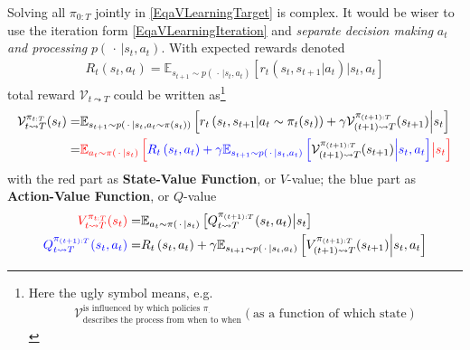 Solving all $ \pi_{0:T} $ jointly in \autoref{EqaVLearningTarget} is complex. It would be wiser to use the iteration form \autoref{EqaVLearningIteration} and \textit{separate decision making} $ a_t $ \textit{and processing} $ p(\, \cdot \, |s_t,a_t) $. With expected rewards denoted
\begin{align}
    R_t(s_t,a_t)= \mathbb{E}_{s_{t+1}\sim p\left(\, \cdot \, |s_t,a_t\right)}\left[ r_t(s_t,s_{t+1}|a_t)\big| s_t,a_t \right]
\end{align}
total reward $ \mathcal{V}_{t\leadsto T} $ could be written as\footnote{Here the ugly symbol means, e.g.
\begin{align*}
     \mathcal{V}_{\text{describes the process from when to when} }^{\text{is influenced by which policies }\pi_{\cdot }}(\text{as a function of which state})
\end{align*}
}
\begin{align}
    \mathcal{V}_{t\leadsto T}^{\pi_{t:T}}(s_t)=&\mathbb{E}_{s_{t+1}\sim p\left(\, \cdot \, |s_t,a_t\sim\pi(s_t)\right)}\left[ r_t\left(s_t,s_{t+1}|a_t\sim \pi_t(s_t)\right)+\gamma \mathcal{V}_{(t+1)\leadsto T}^{\pi_{(t+1):T}} (s_{t+1})\Big|s_t\right] \\
    =&{\color{red}\mathbb{E}_{a_t\sim \pi(\, \cdot \, |s_t)}\left[{\color{blue}R_{t}\left(s_t,a_t\right)+  \gamma\mathbb{E}_{s_{t+1}\sim p\left(\, \cdot \, |s_t,a_t\right)}\left[{\color{black}  \mathcal{V}_{(t+1)\leadsto T}^{\pi_{(t+1):T}} (s_{t+1})} \Big| s_t,a_t \right]}  \big|s_t\right]}
\end{align}
with the {red} part as \textbf{State-Value Function}, or {\color{red}$ V $-value}; the {blue} part as \textbf{Action-Value Function}, or {\color{blue}$ Q $-value}
\begin{align}
    {\color{red}V_{t\leadsto T}^{\pi_{t:T}}(s_t)}=&\mathbb{E}_{a_t\sim \pi(\, \cdot \, |s_t)}\left[ Q_{t\leadsto T}^{\pi_{(t+1):T}}(s_t,a_t)  \big|s_t\right]\\
    {\color{blue}Q_{t\leadsto T}^{\pi_{(t+1):T}}(s_t,a_t)}=&R_t\left(s_t,a_t\right)+\gamma \mathbb{E}_{s_{t+1}\sim p\left(\, \cdot \, |s_t,a_t\right)}\left[V_{(t+1)\leadsto T}^{\pi_{(t+1):T}} (s_{t+1})\Big| s_t,a_t\right]
\end{align}

